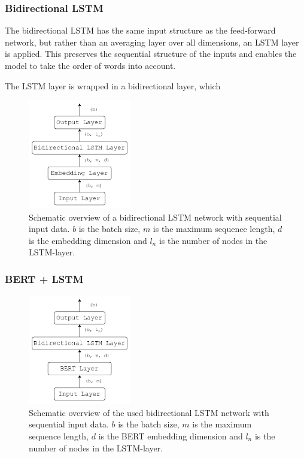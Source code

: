 \subsubsection*{Bidirectional LSTM}

The bidirectional LSTM has the same input structure as the feed-forward network, but rather than an averaging layer over all dimensions, an LSTM layer is applied. This preserves the sequential structure of the inputs and enables the model to take the order of words into account. 

The LSTM layer is wrapped in a bidirectional layer, which 

\begin{figure}[H]
    \centering
    \includegraphics[width=0.4\textwidth]{Figures/figs-bidir-lstm.pdf}
    \caption{Schematic overview of a bidirectional LSTM network with sequential input data. $b$ is the batch size, $m$ is the maximum sequence length, $d$ is the embedding dimension and $l_n$ is the number of nodes in the LSTM-layer.}
\end{figure}

\subsubsection*{BERT + LSTM}



\begin{figure}[H]
    \centering
    \includegraphics[width=0.4\textwidth]{Figures/figs-bert-lstm.pdf}
    \caption{Schematic overview of the used bidirectional LSTM network with sequential input data. $b$ is the batch size, $m$ is the maximum sequence length, $d$ is the BERT embedding dimension and $l_n$ is the number of nodes in the LSTM-layer.}
\end{figure}


